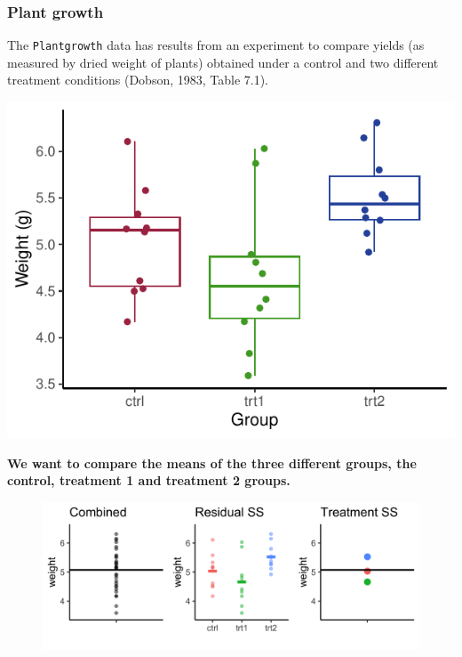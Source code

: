 \documentclass[a4paper]{article}\usepackage[]{graphicx}\usepackage[]{xcolor}
\makeatletter
\def\maxwidth{ %
  \ifdim\Gin@nat@width>\linewidth
    \linewidth
  \else
    \Gin@nat@width
  \fi
}
\makeatother
\begin{document}
\subsubsection{Plant growth}
The \lstinline|Plantgrowth| data has results from an experiment to compare yields (as measured by dried weight of plants) obtained under a control and two different treatment conditions (Dobson, 1983, Table 7.1).
\begin{Schunk}


{\centering \includegraphics[width=\maxwidth]{figure/listings-unnamed-chunk-222-1} 

}

\end{Schunk}
\begin{greenbox}
	\textbf{We want to compare the means of the three different groups, the control, treatment 1 and treatment 2 groups.}
\end{greenbox}
\begin{figure}[H]
	\centering
	\includegraphics[scale=0.15]{plantgrowth}
\end{figure}
\end{document}
